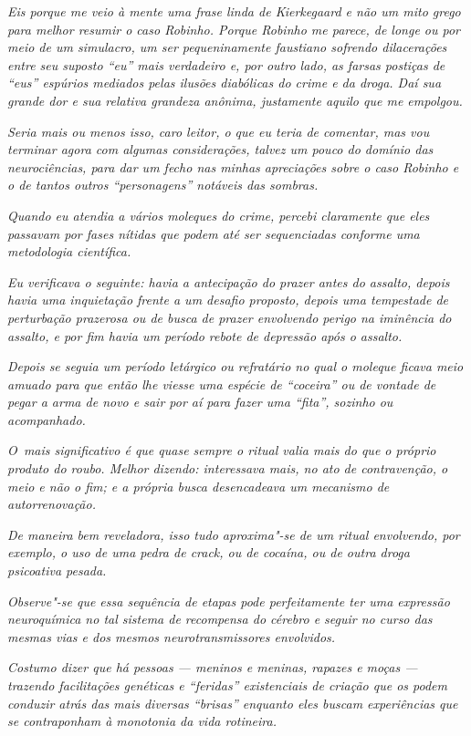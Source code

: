 \emph{Eis porque me veio à mente uma frase linda de Kierkegaard e não um
mito grego para melhor resumir o caso Robinho. Porque Robinho me
parece, de longe ou por meio de um simulacro, um ser pequeninamente
faustiano sofrendo dilacerações entre seu suposto ``eu'' mais verdadeiro
e, por outro lado, as farsas postiças de ``eus'' espúrios mediados pelas
ilusões diabólicas do crime e da droga. Daí sua grande dor e sua
relativa grandeza anônima, justamente aquilo que me empolgou.}

\emph{Seria mais ou menos isso, caro leitor, o que eu teria de comentar,
mas vou terminar agora com algumas considerações, talvez um pouco do
domínio das neurociências, para dar um fecho nas minhas apreciações sobre
o caso Robinho e o de tantos outros ``personagens'' notáveis das
sombras.}

\emph{Quando eu atendia a vários moleques do crime, percebi claramente
que eles passavam por fases nítidas que podem até ser sequenciadas
conforme uma metodologia científica.}

\emph{Eu verificava o seguinte: havia a antecipação do prazer antes do
assalto, depois havia uma inquietação frente a um desafio proposto,
depois uma tempestade de perturbação prazerosa ou de busca de prazer
envolvendo perigo na iminência do assalto, e por fim havia um período
rebote de depressão após o assalto.}

\emph{Depois se seguia um período letárgico ou refratário no qual o
moleque ficava meio amuado para que então lhe viesse uma espécie de
``coceira'' ou de vontade de pegar a arma de novo e sair por aí para
fazer uma ``fita'', sozinho ou acompanhado.}

\emph{O~mais significativo é que quase sempre o ritual valia mais do que
o próprio produto do roubo. Melhor dizendo: interessava mais, no ato de
contravenção, o meio e não o fim; e a própria busca desencadeava um
mecanismo de autorrenovação.}

\emph{De maneira bem reveladora, isso tudo aproxima"-se de um ritual
envolvendo, por exemplo, o uso de uma pedra de crack, ou de cocaína, ou
de outra droga psicoativa pesada.}

\emph{Observe"-se que essa sequência de etapas pode perfeitamente ter uma
expressão neuroquímica no tal sistema de recompensa do cérebro e seguir
no curso das mesmas vias e dos mesmos neurotransmissores envolvidos.}

\emph{Costumo dizer que há pessoas --- meninos e meninas, rapazes e
moças --- trazendo facilitações genéticas e ``feridas'' existenciais de
criação que os podem conduzir atrás das mais diversas ``brisas''
enquanto eles buscam experiências que se contraponham à monotonia da
vida rotineira.}

